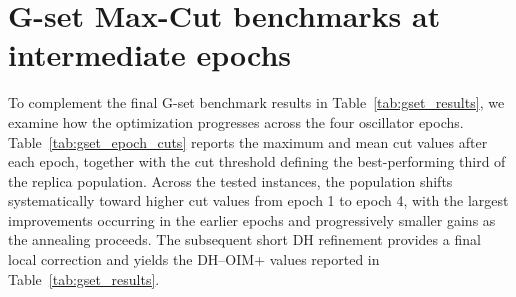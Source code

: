 \documentclass[
reprint,
amsmath,amssymb,
aps,
pre,
floatfix,
]{revtex4-2}
\begin{document}
\section{G-set Max-Cut benchmarks at intermediate epochs}
\label{app:Intermediate}

To complement the final G-set benchmark results in Table~\ref{tab:gset_results}, we examine how
the optimization progresses across the four oscillator epochs. Table~\ref{tab:gset_epoch_cuts}
reports the maximum and mean cut values after each epoch, together with the
cut threshold defining the best-performing third of the replica population.
Across the tested instances, the population shifts systematically toward
higher cut values from epoch 1 to epoch 4, with the largest improvements occurring in
the earlier epochs and progressively smaller gains as the annealing proceeds.
The subsequent short DH refinement provides a final local correction and
yields the DH--OIM+ values reported in Table~\ref{tab:gset_results}.


\end{document}
